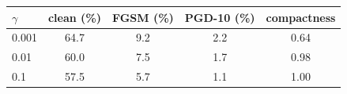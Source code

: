 \begin{tabular}{@{}lcccc@{}}
\toprule
$\gamma$ & clean (\%) & FGSM (\%) & PGD-10 (\%) & compactness \\
\midrule
0.001 & 64.7 & 9.2 & 2.2 & 0.64 \\
0.01 & 60.0 & 7.5 & 1.7 & 0.98 \\
0.1 & 57.5 & 5.7 & 1.1 & 1.00 \\
\bottomrule
\end{tabular}
